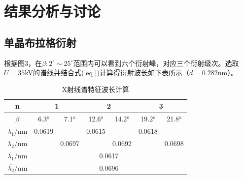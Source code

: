 \documentclass[11pt,a4paper]{article}
\begin{document}
\section{结果分析与讨论}
\subsection{单晶布拉格衍射}
根据图3，在$\beta:2^\circ \sim 25^\circ$范围内可以看到六个衍射峰，对应三个衍射级次。选取$U=35 $kV的谱线并结合式(\ref{eq
})计算得衍射波长如下表所示（$d=0.282 $nm）。

\begin{table}[H]
    \centering
	\caption{X射线谱特征波长计算}
        \begin{tabular}{|c|cccccc|}
        \hline
        n       & \multicolumn{2}{c|}{1}                                    & \multicolumn{2}{c|}{2}                                    & \multicolumn{2}{c|}{3}               \\ \hline
        $\beta$   & \multicolumn{1}{c|}{6.3°}   & \multicolumn{1}{c|}{7.1°}   & \multicolumn{1}{c|}{12.6°}  & \multicolumn{1}{c|}{14.2°}  & \multicolumn{1}{c|}{19.2°}  & 21.8°  \\ \hline
        $\lambda_1$/nm & \multicolumn{1}{c|}{0.0619} & \multicolumn{1}{c|}{}       & \multicolumn{1}{c|}{0.0615} & \multicolumn{1}{c|}{}       & \multicolumn{1}{c|}{0.0618} &        \\ \hline
        $\lambda_2$/nm & \multicolumn{1}{c|}{}       & \multicolumn{1}{c|}{0.0697} & \multicolumn{1}{c|}{}       & \multicolumn{1}{c|}{0.0692} & \multicolumn{1}{c|}{}       & 0.0698 \\ \hline
        $\overline{\lambda_1}$/nm & \multicolumn{6}{c|}{0.0617}                                                                                                                                  \\ \hline
        $\overline{\lambda_2}$/nm & \multicolumn{6}{c|}{0.0696}                                                                                                                                  \\ \hline
        \end{tabular}
        \end{table}
\end{document}
